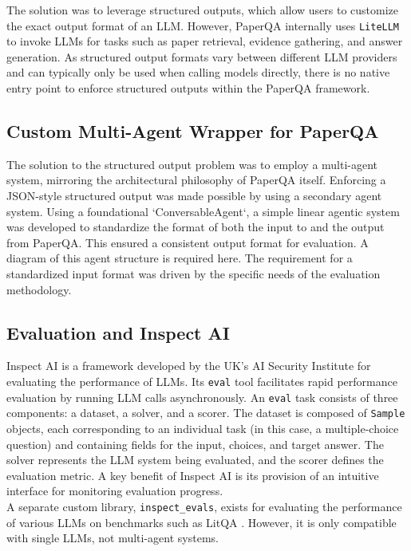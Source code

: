 The solution was to leverage structured outputs, which allow users to customize the exact output format of an LLM. However, PaperQA internally uses \texttt{LiteLLM} to invoke LLMs for tasks such as paper retrieval, evidence gathering, and answer generation. As structured output formats vary between different LLM providers and can typically only be used when calling models directly, there is no native entry point to enforce structured outputs within the PaperQA framework.

\subsection{Custom Multi-Agent Wrapper for PaperQA}
The solution to the structured output problem was to employ a multi-agent system, mirroring the architectural philosophy of PaperQA itself. Enforcing a JSON-style structured output was made possible by using a secondary agent system. 
Using a foundational `ConversableAgent`, a simple linear agentic system was developed to standardize the format of both the input to and the output from PaperQA. 
This ensured a consistent output format for evaluation. 
A diagram of this agent structure is required here.
The requirement for a standardized input format was driven by the specific needs of the evaluation methodology. 

\subsection{Evaluation and Inspect AI}

Inspect AI is a framework developed by the UK's AI Security Institute for evaluating the performance of LLMs. Its \texttt{eval} tool facilitates rapid performance evaluation by running LLM calls asynchronously. An \texttt{eval} task consists of three components: a dataset, a solver, and a scorer. The dataset is composed of \texttt{Sample} objects, each corresponding to an individual task (in this case, a multiple-choice question) and containing fields for the input, choices, and target answer. The solver represents the LLM system being evaluated, and the scorer defines the evaluation metric. A key benefit of Inspect AI is its provision of an intuitive interface for monitoring evaluation progress.\\

A separate custom library, \texttt{inspect\_evals}, exists for evaluating the performance of various LLMs on benchmarks such as LitQA \cite{laurent_lab-bench_2024}. However, it is only compatible with single LLMs, not multi-agent systems. \\

